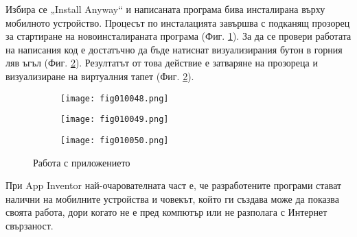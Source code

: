 Избира се „Install Anyway“ и написаната програма бива инсталирана върху мобилното устройство. Процесът по инсталацията завършва с подканящ прозорец за стартиране на новоинсталираната програма (Фиг. \ref{fig010048}). За да се провери работата на написания код е достатъчно да бъде натиснат визуализирания бутон в горния ляв ъгъл (Фиг. \ref{fig010049}). Резултатът от това действие е затваряне на прозореца и визуализиране на виртуалния тапет (Фиг. \ref{fig010049}).

\begin{figure}[H]
  \begin{subfigure}{0.31\textwidth}
  \texttt{[image: fig010048.png]}
  \label{fig010048}
  \end{subfigure}
  \begin{subfigure}{0.31\textwidth}
  \texttt{[image: fig010049.png]}
  \label{fig010049}
  \end{subfigure}
  \begin{subfigure}{0.31\textwidth}
  \texttt{[image: fig010050.png]}
  \label{fig010050}
  \end{subfigure}
  \caption{Работа с приложението}
\end{figure}

При App Inventor най-очарователната част е, че разработените програми стават налични на мобилните устройства и човекът, който ги създава може да показва своята работа, дори когато не е пред компютър или не разполага с Интернет свързаност. 

